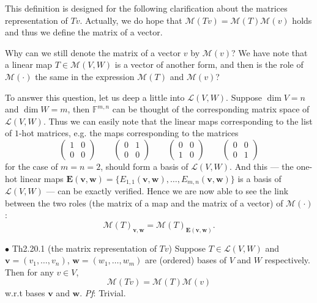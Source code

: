 \documentclass{article}
\begin{document}
\begin{Rmk}{}
    This definition is designed for the following clarification about the matrices representation of $Tv$. Actually, we do hope that $\mathcal{M}(Tv) = \mathcal{M}(T)\mathcal{M}(v)$ holds and thus we define the matrix of a vector.

    Why can we still denote the matrix of a vector $v$ by $\mathcal{M}(v)$? We have note that a linear map $T\in\mathcal{M}(V, W)$ is a vector of another form, and then is the role of $\mathcal{M}(\cdot)$ the same in the expression $\mathcal{M}(T)$ and $\mathcal{M}(v)$?

    To answer this question, let us deep a little into $\mathcal{L}(V,W)$. Suppose $\dim V = n$ and $\dim W = m$, then $\mathbb{F}^{m,n}$ can be thought of the corresponding matrix space of $\mathcal{L}(V, W)$. Thus we can easily note that the linear maps corresponding to the list of $1$-hot matrices, e.g. the maps corresponding to the matrices
    $$
    \begin{pmatrix}
        1 & 0 \\
        0 & 0
    \end{pmatrix} \qquad
    \begin{pmatrix}
        0 & 1 \\
        0 & 0
    \end{pmatrix} \qquad
    \begin{pmatrix}
        0 & 0 \\
        1 & 0
    \end{pmatrix} \qquad
    \begin{pmatrix}
        0 & 0 \\
        0 & 1
    \end{pmatrix}
    $$
    for the case of $m=n=2$, should form a basis of $\mathcal{L}(V, W)$. \textcolor{Th}{And this —  the one-hot linear maps $\pmb{E}(\pmb{v}, \pmb{w}) = \{E_{1,1}(\pmb{v}, \pmb{w}), \dots, E_{m,n}(\pmb{v}, \pmb{w})\}$ is a basis of $\mathcal{L}(V, W)$ —  can be exactly verified.} Hence we are now able to see the link between the two roles (the matrix of a map and the matrix of a vector) of $\mathcal{M}(\cdot)$:
    \textcolor{Th}{$$\mathcal{M}(T)_{\pmb{v}, \pmb{w}} = \mathcal{M}(T)_{\pmb{E}(\pmb{v},\pmb{w})}.$$}
\end{Rmk}

\begin{Th}{$\bullet$ Th2.20.1 (the matrix representation of $Tv$)}
    Suppose $T\in\mathcal{L}(V, W)$ and $\pmb{v} = (v_1, \dots, v_n)$, $\pmb{w} = (w_1, \dots, w_m)$ are (ordered) bases of $V$ and $W$ respectively. Then for any $v\in V$, 
    $$\mathcal{M}(Tv) = \mathcal{M}(T)\mathcal{M}(v)$$
    w.r.t bases $\pmb{v}$ and $\pmb{w}$.
    \textit{Pf}: Trivial.
\end{Th}
\end{document}
